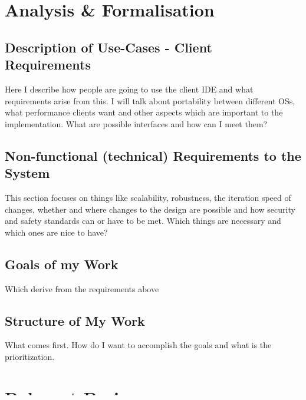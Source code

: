 \documentclass[12p]{scrartcl}
\begin{document}
\section{Analysis \& Formalisation}

\subsection{Description of Use-Cases - Client Requirements}
Here I describe how people are going to use the client IDE and what requirements arise from this. I will talk about portability between different OSs, what performance clients want and other aspects which are important to the implementation. What are possible interfaces and how can I meet them?
\subsection{Non-functional (technical) Requirements to the System}
This section focuses on things like scalability, robustness, the iteration speed of changes, whether and where changes to the design are possible and how security and safety standards can or have to be met. Which things are necessary and which ones are nice to have?
\subsection{Goals of my Work}
Which derive from the requirements above
\subsection{Structure of My Work}
What comes first. How do I want to accomplish the goals and what is the prioritization.


\section{Relevant Basics}
\subsection{JVM - Choice of Language and Context}
Why it is still relevant in the context of large-scale distributed computation
\subsection{SQL to NoSQL - Why Graph Databases?}
What are recent developments in the requirements on databases and how are those met. New types of databases are emerging.
\end{document}
